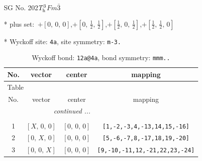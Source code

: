 \documentclass[fleqn,8pt]{jsarticle}
\begin{document}
\setcounter{MaxMatrixCols}{32}

\renewcommand{\tablename}{Table~}
\renewcommand{\figurename}{Figure~}
\begin{center}
\LARGE
SG No. 202\quad$T_{\rm h}^{3}$\quad$Fm\bar{3}$\quad[ cubic ]
\end{center}

* plus set:\,\,\,$+\left[ 0,\, 0,\, 0 \right]$,\quad $+\left[ 0,\, \frac{1}{2},\, \frac{1}{2} \right]$,\quad $+\left[ \frac{1}{2},\, 0,\, \frac{1}{2} \right]$,\quad $+\left[ \frac{1}{2},\, \frac{1}{2},\, 0 \right]$


* Wyckoff site: {\tt 4a}, site symmetry: {\tt m-3.}
\renewcommand{\arraystretch}{1.2}
\begin{longtable}{cccc}
\caption{Wyckoff bond: {\tt 12a@4a}, bond symmetry: {\tt mmm..}}
 \\
 \hline \hline
No. & vector & center & mapping \\ \hline \endfirsthead

\multicolumn{3}{l}{\tablename\ \thetable{}} \\
 \hline \hline
No. & vector & center & mapping \\ \hline \endhead

 \hline \hline
\multicolumn{3}{r}{\footnotesize\it continued ...} \\ \endfoot

 \hline \hline
\multicolumn{3}{r}{} \\ \endlastfoot

1 & $\left[ X,\, 0,\, 0 \right]$ & $\left[ 0,\, 0,\, 0 \right]$ & {\tt [1,-2,-3,4,-13,14,15,-16]} \\ \hline
2 & $\left[ 0,\, X,\, 0 \right]$ & $\left[ 0,\, 0,\, 0 \right]$ & {\tt [5,-6,-7,8,-17,18,19,-20]} \\ \hline
3 & $\left[ 0,\, 0,\, X \right]$ & $\left[ 0,\, 0,\, 0 \right]$ & {\tt [9,-10,-11,12,-21,22,23,-24]} \\
\end{longtable}
\renewcommand{\arraystretch}{1.2}
\end{document}
